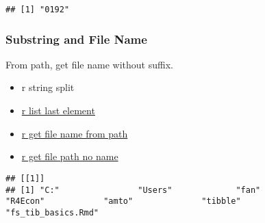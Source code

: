 \documentclass[
]{book}
\newenvironment{Shaded}{\begin{snugshade}}{\end{snugshade}}
\newcommand{\CharTok}[1]{\textcolor[rgb]{0.31,0.60,0.02}{#1}}
\newcommand{\DataTypeTok}[1]{\textcolor[rgb]{0.13,0.29,0.53}{#1}}
\newcommand{\DecValTok}[1]{\textcolor[rgb]{0.00,0.00,0.81}{#1}}
\newcommand{\KeywordTok}[1]{\textcolor[rgb]{0.13,0.29,0.53}{\textbf{#1}}}
\newcommand{\NormalTok}[1]{#1}
\newcommand{\StringTok}[1]{\textcolor[rgb]{0.31,0.60,0.02}{#1}}
\providecommand{\tightlist}{%
  \setlength{\itemsep}{0pt}\setlength{\parskip}{0pt}}
\begin{document}
\begin{verbatim}
## [1] "0192"
\end{verbatim}

\hypertarget{substring-and-file-name}{%
\subsubsection{Substring and File Name}\label{substring-and-file-name}}

From path, get file name without suffix.

\begin{itemize}
\tightlist
\item
  r string split
\item
  \href{https://stackoverflow.com/a/83222/8280804}{r list last element}
\item
  \href{https://stackoverflow.com/a/29114007/8280804}{r get file name from path}
\item
  \href{https://stackoverflow.com/a/47189541/8280804}{r get file path no name}
\end{itemize}

\begin{Shaded}
\end{Shaded}

\begin{verbatim}
## [[1]]
## [1] "C:"                "Users"             "fan"               "R4Econ"            "amto"              "tibble"            "fs_tib_basics.Rmd"
\end{verbatim}
\end{document}
